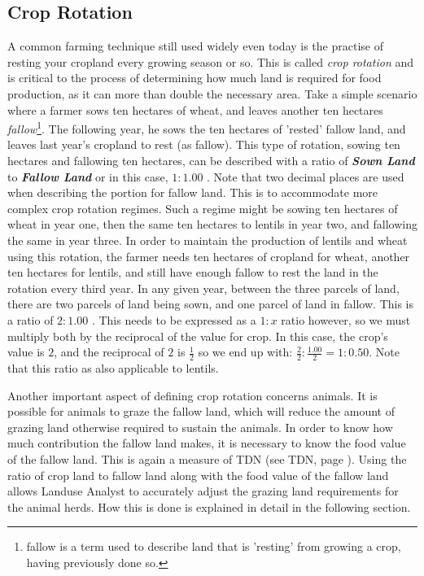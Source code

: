     \subsection{Crop Rotation}
    \label{cropRotation}
    A common farming technique still used widely even today is the practise of
resting your cropland every growing season or so.  This is called \textit{crop
rotation} and is critical to the process of determining how much land is
required for food production, as it can more than double the necessary area. 
Take a simple scenario where a farmer sows ten hectares of wheat, and leaves
another ten hectares \textit{fallow}\footnote{fallow is a term used to describe
land that is 'resting' from growing a crop, having previously done so.}.  The
following year, he sows the ten hectares of 'rested' fallow land, and leaves
last year's cropland to rest (as fallow).  This type of rotation, sowing ten
hectares and fallowing ten hectares, can be described with a ratio of
\textbf{\textit{Sown Land}} to \textbf{\textit{Fallow Land}} or in this case,
$1:1.00$ .  Note that two decimal places are used when describing the portion
for fallow land.  This is to accommodate more complex crop rotation regimes. 
Such a regime might be sowing ten hectares of wheat in year one, then the same
ten hectares to lentils in year two, and fallowing the same in year three.  In
order to maintain the production of lentils and wheat using this rotation, the
farmer needs ten hectares of cropland for wheat, another ten hectares for
lentils, and still have enough fallow to rest the land in the rotation every
third year.  In any given year, between the three parcels of land, there are two
parcels of land being sown, and one parcel of land in fallow.  This is a ratio
of $2:1.00$ .  This needs to be expressed as a $1:x$ ratio however, so we must
multiply both by the reciprocal of the value for crop.  In this case, the crop's
value is $2$, and the reciprocal of $2$ is $\frac{1}{2}$ so we end up with:
$\frac{2}{2}:\frac{1.00}{2} = 1:0.50$.  Note that this ratio as also applicable
to lentils.

    Another important aspect of defining crop rotation concerns animals.  It is
possible for animals to graze the fallow land, which will reduce the amount of
grazing land otherwise required to sustain the animals.  In order to know how
much contribution the fallow land makes, it is necessary to know the food value
of the fallow land.  This is again a measure of TDN (see TDN, page
\pageref{TDN}).  Using the ratio of crop land to fallow land along with the food
value of the fallow land allows Landuse Analyst to accurately adjust the grazing
land requirements for the animal herds.  How this is done is explained in detail
in the following section.

